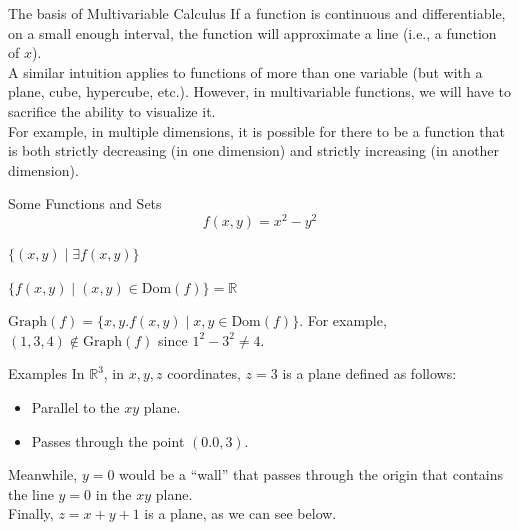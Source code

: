 \documentclass[8pt]{extarticle}
\title{}
\author{Avinash Iyer}
\date{}
\begin{document}
  \begin{problem}{The basis of Multivariable Calculus}
    If a function is continuous and differentiable, on a small enough interval, the function will approximate a line (i.e., a function of $x$).\\

    A similar intuition applies to functions of more than one variable (but with a plane, cube, hypercube, etc.). However, in multivariable functions, we will have to sacrifice the ability to visualize it.\\

    For example, in multiple dimensions, it is possible for there to be a function that is both strictly decreasing (in one dimension) and strictly increasing (in another dimension).
  \end{problem}
  \begin{problem}{Some Functions and Sets}
    \[
      f(x,y) = x^2-y^2
    \] 
    \begin{description}[font=\normalfont\scshape]
      \item[Domain:]  $\{(x,y)\mid \exists f(x,y)\}$
      \item[Range:] $\{f(x,y) \mid (x,y)\in \textrm{Dom}(f)\} = \mathbb{R}$
      \item[Graph:] $\textrm{Graph}(f) = \{x,y.f(x,y) \mid x,y\in \textrm{Dom}(f)\}$. For example, $(1,3,4)\notin \textrm{Graph}(f)$ since $1^2-3^2 \neq 4$.
    \end{description}
  \end{problem}
  \begin{problem}{Examples}
    In $\mathbb{R}^3$, in $x,y,z$ coordinates, $z=3$ is a plane defined as follows:
    \begin{itemize}
      \item Parallel to the $xy$ plane.
      \item Passes through the point $(0.0,3)$.
    \end{itemize}
    \begin{center}
    \end{center}
    Meanwhile, $y=0$ would be a ``wall'' that passes through the origin that contains the line $y=0$ in the $xy$ plane.\\

    Finally, $z = x+y+1$ is a plane, as we can see below.
    \begin{center}
    \end{center}
  \end{problem}
\end{document}
